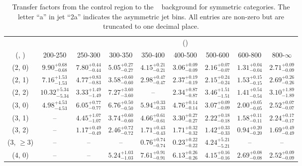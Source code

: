 \begin{table}[h!]
\tiny
\centering
\caption{Transfer factors from the \mmj control region to the \zInv~ background for symmetric categories. The letter ``a'' in jet \eg ``2a''  indicates the asymmetric jet bins. All entries are non-zero but are truncated to one decimal place.\label{tab:tf_mumu_zinv_sym}}
\begin{tabular}
{ccccccccc}
	\hline\hline
&	& \multicolumn{8}{c}{\scalht (\gev)} \\ 
	 (\njet,  \nb) & 200-250 & 250-300 & 300-350 & 350-400 & 400-500 & 500-600 & 600-800 & 800-$\infty$ \\ [0.8ex] 
\hline
	(2, 0) & $9.90^{+ 0.68 }_{- 0.68 }$ & $7.80^{+ 0.44 }_{- 0.44 }$ & $5.05^{+ 0.27 }_{- 0.27 }$ & $4.15^{+ 0.21 }_{- 0.21 }$ & $3.06^{+ 0.09 }_{- 0.09 }$ & $2.16^{+ 0.07 }_{- 0.07 }$ & $1.31^{+ 0.04 }_{- 0.04 }$ & $2.71^{+ 0.09 }_{- 0.09 }$ \\[0.5ex] 
	(2, 1) & $7.16^{+ 1.53 }_{- 1.53 }$ & $4.77^{+ 0.83 }_{- 0.83 }$ & $3.58^{+ 0.60 }_{- 0.60 }$ & $2.98^{+ 0.47 }_{- 0.47 }$ & $2.37^{+ 0.19 }_{- 0.19 }$ & $2.15^{+ 0.24 }_{- 0.24 }$ & $1.53^{+ 0.15 }_{- 0.15 }$ & $2.69^{+ 0.26 }_{- 0.26 }$ \\[0.5ex] 
	(2, 2) & $10.32^{+ 5.34 }_{- 5.34 }$ & $3.33^{+ 1.49 }_{- 1.49 }$ & $7.27^{+ 3.60 }_{- 3.60 }$ & -- & $2.34^{+ 0.87 }_{- 0.87 }$ & $3.46^{+ 1.51 }_{- 1.51 }$ & $1.41^{+ 0.54 }_{- 0.54 }$ & $3.10^{+ 1.89 }_{- 1.89 }$ \\[0.5ex] 
	(3, 0) & $4.98^{+ 4.53 }_{- 4.53 }$ & $6.05^{+ 0.77 }_{- 0.77 }$ & $6.76^{+ 0.50 }_{- 0.50 }$ & $5.94^{+ 0.33 }_{- 0.33 }$ & $4.76^{+ 0.14 }_{- 0.14 }$ & $3.07^{+ 0.09 }_{- 0.09 }$ & $2.00^{+ 0.05 }_{- 0.05 }$ & $2.52^{+ 0.07 }_{- 0.07 }$ \\[0.5ex] 
	(3, 1) & -- & $4.45^{+ 1.07 }_{- 1.07 }$ & $3.74^{+ 0.60 }_{- 0.60 }$ & $4.66^{+ 0.61 }_{- 0.61 }$ & $3.30^{+ 0.27 }_{- 0.27 }$ & $2.22^{+ 0.18 }_{- 0.18 }$ & $1.58^{+ 0.11 }_{- 0.11 }$ & $2.24^{+ 0.17 }_{- 0.17 }$ \\[0.5ex] 
	(3, 2) & -- & $1.17^{+ 0.49 }_{- 0.49 }$ & $2.46^{+ 0.72 }_{- 0.72 }$ & $1.71^{+ 0.43 }_{- 0.43 }$ & $1.71^{+ 0.32 }_{- 0.32 }$ & $1.42^{+ 0.33 }_{- 0.33 }$ & $0.94^{+ 0.20 }_{- 0.20 }$ & $1.69^{+ 0.49 }_{- 0.49 }$ \\[0.5ex] 
	(3, $\ge3$) & -- & -- & -- & $0.76^{+ 0.74 }_{- 0.74 }$ & $0.23^{+ 0.22 }_{- 0.22 }$ & $4.24^{+ 5.21 }_{- 5.21 }$ & -- & -- \\[0.5ex] 
	(4, 0) & -- & -- & $5.24^{+ 1.03 }_{- 1.03 }$ & $7.61^{+ 0.91 }_{- 0.91 }$ & $6.13^{+ 0.26 }_{- 0.26 }$ & $4.15^{+ 0.16 }_{- 0.16 }$ & $2.69^{+ 0.08 }_{- 0.08 }$ & $2.52^{+ 0.09 }_{- 0.09 }$ \\[0.5ex] 

\end{tabular}
\end{table}
